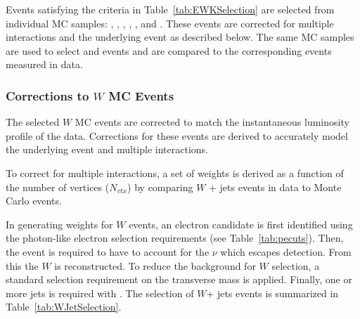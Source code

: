 Events satisfying the criteria in Table~\ref{tab:EWKSelection} are selected from individual MC samples: \zee, \zmm, \ztt, \wen, \wmn, and \wtn. These events are corrected for multiple interactions and the underlying event as described below. The same MC samples are used to select \wjets and \zjets events and are compared to the corresponding events measured in data.

\subsubsection{Corrections to $W$ MC Events}\label{sec:ewkWMCcorrections}
The selected $W$ MC events are corrected to match the instantaneous luminosity profile of the data. Corrections for these events are derived to accurately model the underlying event and multiple interactions.

To correct for multiple interactions, a set of weights is derived as a function of the number of vertices ($N_{vtx}$) by comparing $W$ + jets events in data to Monte Carlo events.

In generating weights for $W$ events, an electron candidate is first identified using the photon-like electron selection requirements (see Table~\ref{tab:pecuts}). Then, the event is required to have  to account for the $\nu$ which escapes detection. From this the $W$ is reconstructed. To reduce the background for $W$ selection, a standard selection requirement on the transverse mass is applied. Finally, one or more jets is required with . The selection of $W$+ jets events is summarized in Table~\ref{tab:WJetSelection}.

